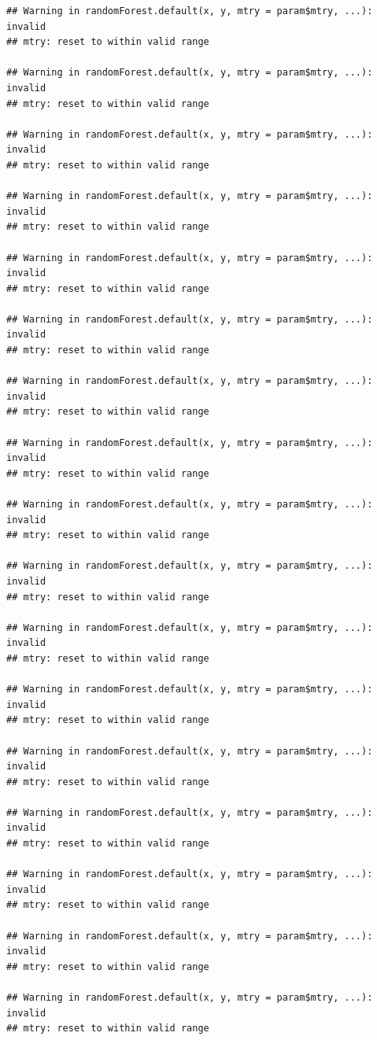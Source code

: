 \documentclass[]{article}
\begin{document}
\begin{verbatim}
## Warning in randomForest.default(x, y, mtry = param$mtry, ...): invalid
## mtry: reset to within valid range

## Warning in randomForest.default(x, y, mtry = param$mtry, ...): invalid
## mtry: reset to within valid range

## Warning in randomForest.default(x, y, mtry = param$mtry, ...): invalid
## mtry: reset to within valid range

## Warning in randomForest.default(x, y, mtry = param$mtry, ...): invalid
## mtry: reset to within valid range

## Warning in randomForest.default(x, y, mtry = param$mtry, ...): invalid
## mtry: reset to within valid range

## Warning in randomForest.default(x, y, mtry = param$mtry, ...): invalid
## mtry: reset to within valid range

## Warning in randomForest.default(x, y, mtry = param$mtry, ...): invalid
## mtry: reset to within valid range

## Warning in randomForest.default(x, y, mtry = param$mtry, ...): invalid
## mtry: reset to within valid range

## Warning in randomForest.default(x, y, mtry = param$mtry, ...): invalid
## mtry: reset to within valid range

## Warning in randomForest.default(x, y, mtry = param$mtry, ...): invalid
## mtry: reset to within valid range

## Warning in randomForest.default(x, y, mtry = param$mtry, ...): invalid
## mtry: reset to within valid range

## Warning in randomForest.default(x, y, mtry = param$mtry, ...): invalid
## mtry: reset to within valid range

## Warning in randomForest.default(x, y, mtry = param$mtry, ...): invalid
## mtry: reset to within valid range

## Warning in randomForest.default(x, y, mtry = param$mtry, ...): invalid
## mtry: reset to within valid range

## Warning in randomForest.default(x, y, mtry = param$mtry, ...): invalid
## mtry: reset to within valid range

## Warning in randomForest.default(x, y, mtry = param$mtry, ...): invalid
## mtry: reset to within valid range

## Warning in randomForest.default(x, y, mtry = param$mtry, ...): invalid
## mtry: reset to within valid range


\end{verbatim}
\end{document}
